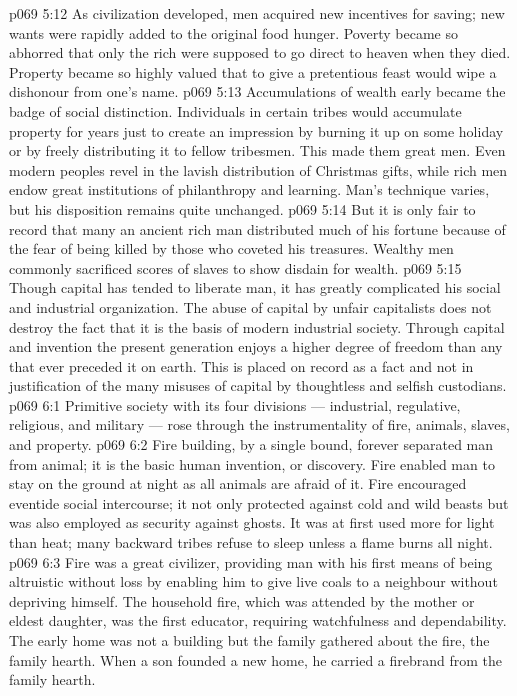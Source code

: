 \vs p069 5:12 \pc As civilization developed, men acquired new incentives for saving; new wants were rapidly added to the original food hunger. Poverty became so abhorred that only the rich were supposed to go direct to heaven when they died. Property became so highly valued that to give a pretentious feast would wipe a dishonour from one’s name.
\vs p069 5:13 Accumulations of wealth early became the badge of social distinction. Individuals in certain tribes would accumulate property for years just to create an impression by burning it up on some holiday or by freely distributing it to fellow tribesmen. This made them great men. Even modern peoples revel in the lavish distribution of Christmas gifts, while rich men endow great institutions of philanthropy and learning. Man’s technique varies, but his disposition remains quite unchanged.
\vs p069 5:14 But it is only fair to record that many an ancient rich man distributed much of his fortune because of the fear of being killed by those who coveted his treasures. Wealthy men commonly sacrificed scores of slaves to show disdain for wealth.
\vs p069 5:15 Though capital has tended to liberate man, it has greatly complicated his social and industrial organization. The abuse of capital by unfair capitalists does not destroy the fact that it is the basis of modern industrial society. Through capital and invention the present generation enjoys a higher degree of freedom than any that ever preceded it on earth. This is placed on record as a fact and not in justification of the many misuses of capital by thoughtless and selfish custodians.
\vs p069 6:1 Primitive society with its four divisions --- industrial, regulative, religious, and military --- rose through the instrumentality of fire, animals, slaves, and property.
\vs p069 6:2 Fire building, by a single bound, forever separated man from animal; it is the basic human invention, or discovery. Fire enabled man to stay on the ground at night as all animals are afraid of it. Fire encouraged eventide social intercourse; it not only protected against cold and wild beasts but was also employed as security against ghosts. It was at first used more for light than heat; many backward tribes refuse to sleep unless a flame burns all night.
\vs p069 6:3 Fire was a great civilizer, providing man with his first means of being altruistic without loss by enabling him to give live coals to a neighbour without depriving himself. The household fire, which was attended by the mother or eldest daughter, was the first educator, requiring watchfulness and dependability. The early home was not a building but the family gathered about the fire, the family hearth. When a son founded a new home, he carried a firebrand from the family hearth.
